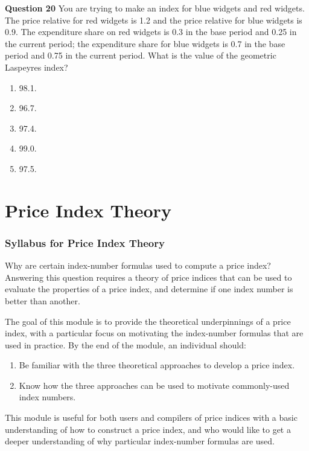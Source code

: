 \documentclass[]{article}
\begin{document}
\textbf{Question 20} You are trying to make an index for blue widgets and red widgets. The price relative for red widgets is 1.2 and the price relative for blue widgets is 0.9. The expenditure share on red widgets is 0.3 in the base period and 0.25 in the current period; the expenditure share for blue widgets is 0.7 in the base period and 0.75 in the current period. What is the value of the geometric Laspeyres index?

\begin{enumerate}
\def\labelenumi{\alph{enumi})}
\item
  98.1.
\item
  96.7.
\item
  97.4.
\item
  99.0.
\item
  97.5.
\end{enumerate}

\hypertarget{part-price-index-theory}{%
\part{Price Index Theory}\label{part-price-index-theory}}

\hypertarget{syllabus-for-price-index-theory}{%
\section{Syllabus for Price Index Theory}\label{syllabus-for-price-index-theory}}

Why are certain index-number formulas used to compute a price index? Answering this question requires a theory of price indices that can be used to evaluate the properties of a price index, and determine if one index number is better than another.

The goal of this module is to provide the theoretical underpinnings of a price index, with a particular focus on motivating the index-number formulas that are used in practice. By the end of the module, an individual should:

\begin{enumerate}
\def\labelenumi{\arabic{enumi}.}
\item
  Be familiar with the three theoretical approaches to develop a price index.
\item
  Know how the three approaches can be used to motivate commonly-used index numbers.
\end{enumerate}

This module is useful for both users and compilers of price indices with a basic understanding of how to construct a price index, and who would like to get a deeper understanding of why particular index-number formulas are used.
\end{document}
